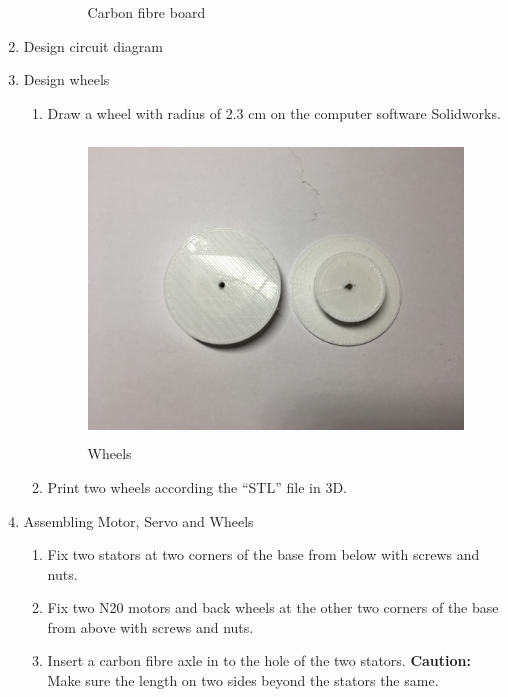 \begin{enumerate}
\begin{enumerate}
\begin{figure}[H]
\begin{center}
	\end{center}
 	\caption{Carbon fibre board \label{fig:carbonFiberBoard}}
	\end{figure}
	\end{enumerate}
\item Design circuit diagram 
\item Design wheels
	\begin{enumerate}
	\item Draw a wheel with radius of 2.3 cm on the computer software Solidworks.\\
	\begin{figure}[H]
	\begin{center}
	\includegraphics[height=8cm]{figure/procedure/p3}
	\end{center}
 	\caption{Wheels \label{fig:wheels}}
	\end{figure}
	\item Print two wheels according the ``STL'' file in 3D.
	\end{enumerate}
\item Assembling Motor, Servo and Wheels
	\begin{enumerate}
	\item Fix two stators at two corners of the base from below with screws and nuts. 
	\item Fix two N20 motors and back wheels at the other two corners of the base from above with screws and nuts.
	\item Insert a carbon fibre axle in to the hole of the two stators. \textbf{Caution:} Make sure the length on two sides beyond the stators the same. \\
	\begin{figure}[H]
	\begin{center}

\end{center}
\end{figure}
\end{enumerate}
\end{enumerate}
